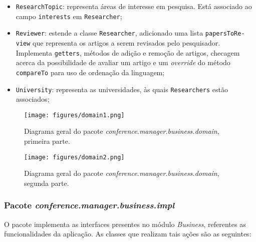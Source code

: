 \documentclass[a4paper, 12pt]{article}
\begin{document}
\begin{itemize}
\item \verb|ResearchTopic|: representa áreas de interesse em pesquisa. Está associado ao campo \verb|interests| em \verb|Researcher|;

\item \verb|Reviewer|: estende a classe \verb|Researcher|, adicionado uma lista \verb|papersToRe-| \verb|view| que representa os artigos a serem revisados pelo pesquisador. Implementa \verb|getters|, métodos de adição e remoção de artigos, checagem acerca da possibilidade de avaliar um artigo e um \emph{override} do método \verb|compareTo| para uso de ordenação da linguagem;

\item \verb|University|: representa as universidades, às quais \verb|Researchers| estão associados;
\end{itemize}

\begin{figure}[h]
\centering
\texttt{[image: figures/domain1.png]}
\caption{Diagrama geral do pacote \emph{conference.manager.business.domain}, primeira parte.}
\label{fig:domain}
\end{figure}

\begin{figure}[h]
\centering
\texttt{[image: figures/domain2.png]}
\caption{Diagrama geral do pacote \emph{conference.manager.business.domain}, segunda parte.}
\label{fig:domain2}
\end{figure}

\FloatBarrier

\subsubsection{Pacote \emph{conference.manager.business.impl}}
O pacote implementa as interfaces presentes no módulo \emph{Business}, referentes as funcionalidades da aplicação. As classes que realizam tais ações são as seguintes:
\end{document}
